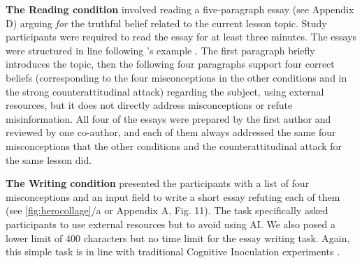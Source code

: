 \documentclass[sigconf]{acmart}
\begin{document}
\textbf{The Reading condition} involved reading a five-paragraph essay (see Appendix D) arguing \textit{for} the truthful belief related to the current lesson topic. Study participants were required to read the essay for at least three minutes. 
The essays were structured in line following \citeauthor{Fransen_Mollen_Rains_Das_Vermeulen_2024}'s example \cite{Fransen_Mollen_Rains_Das_Vermeulen_2024}. 
The first paragraph briefly introduces the topic, then the following four paragraphs support four correct beliefs (corresponding to the four misconceptions in the other conditions and in the strong counterattitudinal attack) regarding the subject, using external resources, but it does not directly address misconceptions or refute misinformation. 
All four of the essays were prepared by the first author and reviewed by one co-author, and each of them always addressed the same four misconceptions that the other conditions and the counterattitudinal attack for the same lesson did.

\textbf{The Writing condition} presented the participants with a list of four misconceptions and an input field to write a short essay refuting each of them (see \autoref{fig:herocollage}/a or Appendix A, Fig. 11).
The task specifically asked participants to use external resources but to avoid using AI.
We also posed a lower limit of 400 characters but no time limit for the essay writing task. 
Again, this simple task is in line with traditional Cognitive Inoculation experiments \cite{McGuire_1961, Fransen_Mollen_Rains_Das_Vermeulen_2024}.
\end{document}
